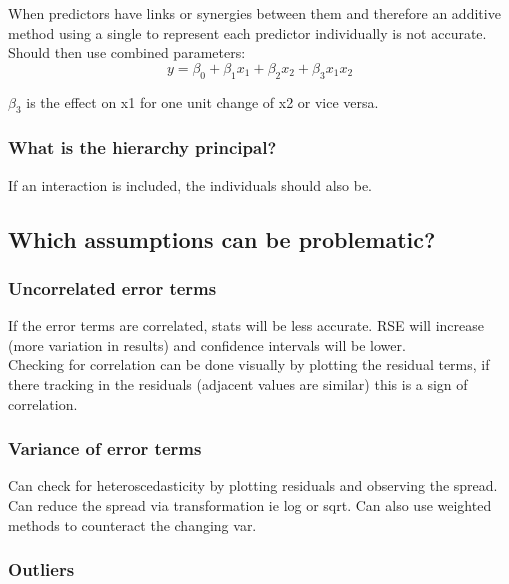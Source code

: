 \documentclass[11pt]{scrartcl} %
\begin{document}
When predictors have links or synergies between them and therefore an additive method using a single
to represent each predictor individually is not accurate.\\

Should then use combined parameters:
\begin{equation}
	y = \beta_0 + \beta_1x_1 + \beta_2x_2 + \beta_3x_1x_2
\end{equation}

\(\beta_3\) is the effect on x1 for one unit change of x2 or vice versa.

\subsubsection{What is the hierarchy principal?}

If an interaction is included, the individuals should also be.

\subsection{Which assumptions can be problematic?}

\subsubsection{Uncorrelated error terms}

If the error terms are correlated, stats will be less accurate. RSE will increase (more variation in results)
and confidence intervals will be lower.\\

Checking for correlation can be done visually by plotting the residual terms, if there tracking in the residuals
(adjacent values are similar) this is a sign of correlation.

\subsubsection{Variance of error terms}

Can check for heteroscedasticity by plotting residuals and observing the spread. Can reduce the spread
via transformation ie log or sqrt. Can also use weighted methods to counteract the changing var.

\subsubsection{Outliers}
\end{document}
